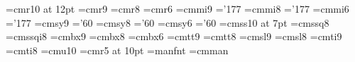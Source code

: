     \font\sssectiontitlefont=cmr10 at 12pt
    \font\ninerm=cmr9
    \font\eightrm=cmr8
    \font\sixrm=cmr6
    \font\ninei=cmmi9
    \skewchar\ninei='177
    \font\eighti=cmmi8
    \skewchar\eighti='177
    \font\sixi=cmmi6
    \skewchar\sixi='177
    \font\ninesy=cmsy9
    \skewchar\ninesy='60
    \font\eightsy=cmsy8
    \skewchar\eightsy='60
    \font\sixsy=cmsy6
    \skewchar\sixsy='60
    \font\holonnumberfont=cmss10 at 7pt
    \def\holonnumbertext#1{{\holonnumberfont #1}}
    \font\eightss=cmssq8
    \font\eightssi=cmssqi8
    \font\ninebf=cmbx9
    \font\eightbf=cmbx8
    \font\sixbf=cmbx6
    \font\ninett=cmtt9
    \hyphenchar{}
    \font\eighttt=cmtt8
    \hyphenchar{}
    \hyphenchar{} %
    \font\ninesl=cmsl9
    \font\eightsl=cmsl8
    \font\nineit=cmti9
    \font\eightit=cmti8
    \font\tenu=cmu10 %
    \font\magnifiedfiverm=cmr5 at 10pt
    \font\manual=manfnt %
    \font\cmman=cmman %
    \newskip\ttglue
    \def\tenpoint{\def\rm{\fam0\tenrm}%
      \textfont0=\tenrm \scriptfont0=\sevenrm \scriptscriptfont0=\fiverm
      \textfont1=\teni \scriptfont1=\seveni \scriptscriptfont1=\fivei
      \textfont2=\tensy \scriptfont2=\sevensy \scriptscriptfont2=\fivesy
      \textfont3=\tenex \scriptfont3=\tenex \scriptscriptfont3=\tenex
      \def\it{\fam\itfam\tenit}%
      \textfont\itfam=\tenit
      \def\sl{\fam\slfam\tensl}%
      \textfont\slfam=\tensl
      \def\bf{\fam\bffam\tenbf}%
      \textfont\bffam=\tenbf \scriptfont\bffam=\sevenbf
       \scriptscriptfont\bffam=\fivebf
      \def\tt{\fam\ttfam\tentt}%
      \textfont\ttfam=\tentt
      \tt \ttglue=.5em plus.25em minus.15em
      \normalbaselineskip=12pt
      \def\MF{{\manual META}\-{\manual FONT}}%
      \let\sc=\eightrm
      \let\big=\tenbig
      \setbox\strutbox=\hbox{\vrule height8.5pt depth3.5pt width\z@}%
      \normalbaselines\rm}
    \def\ninepoint{\def\rm{\fam0\ninerm}%
      \textfont0=\ninerm \scriptfont0=\sixrm \scriptscriptfont0=\fiverm
      \textfont1=\ninei \scriptfont1=\sixi \scriptscriptfont1=\fivei
      \textfont2=\ninesy \scriptfont2=\sixsy \scriptscriptfont2=\fivesy
      \textfont3=\tenex \scriptfont3=\tenex \scriptscriptfont3=\tenex
      \def\it{\fam\itfam\nineit}%
      \textfont\itfam=\nineit
      \def\sl{\fam\slfam\ninesl}%
      \textfont\slfam=\ninesl
      \def\bf{\fam\bffam\ninebf}%
      \textfont\bffam=\ninebf \scriptfont\bffam=\sixbf
       \scriptscriptfont\bffam=\fivebf
      \def\tt{\fam\ttfam\ninett}%
      \textfont\ttfam=\ninett
      \tt \ttglue=.5em plus.25em minus.15em
      \normalbaselineskip=11pt
      \def\MF{{\manual hijk}\-{\manual lmnj}}%
      \let\sc=\sevenrm
      \let\big=\ninebig
      \setbox\strutbox=\hbox{\vrule height8pt depth3pt width\z@}%
      \normalbaselines\rm}
